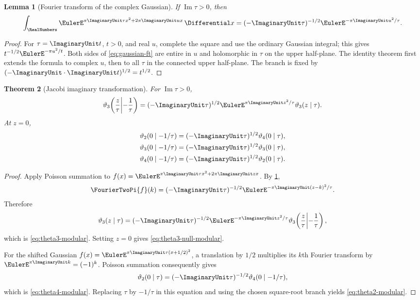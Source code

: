\documentclass[11pt,oneside]{article}
\newtheorem{theorem}{Theorem}[section]
\newtheorem{lemma}[theorem]{Lemma}
\theoremstyle{definition}
\begin{document}
\begin{lemma}[Fourier transform of the complex Gaussian]\label{lem:gaussian-ft}
If $\operatorname{Im}\tau>0$, then
\begin{equation}\label{eq:gaussian-ft}
 \int_\RealNumbers \EulerE^{\pi\ImaginaryUnit\tau x^2+2\pi\ImaginaryUnit ux}\,\Differential x
 =(-\ImaginaryUnit\tau)^{-1/2}\EulerE^{-\pi\ImaginaryUnit u^2/\tau}.
\end{equation}
\end{lemma}

\begin{proof}
For $\tau=\ImaginaryUnit t$, $t>0$, and real $u$, complete the square and use the
ordinary Gaussian integral; this gives
$t^{-1/2}\EulerE^{-\pi u^2/t}$. Both sides of \eqref{eq:gaussian-ft} are
entire in $u$ and holomorphic in $\tau$ on the upper half-plane. The
identity theorem first extends the formula to complex $u$, then to all
$\tau$ in the connected upper half-plane. The branch is fixed by
$(-\ImaginaryUnit\cdot\ImaginaryUnit t)^{1/2}=t^{1/2}$.
\end{proof}

\begin{theorem}[Jacobi imaginary transformation]\label{thm:theta-modular}
For $\operatorname{Im}\tau>0$,
\begin{equation}\label{eq:theta3-modular}
 \vartheta_3\!\left(\frac z\tau\middle|-\frac1\tau\right)
 =(-\ImaginaryUnit\tau)^{1/2}\EulerE^{\pi\ImaginaryUnit z^2/\tau}\vartheta_3(z\mid\tau).
\end{equation}
At $z=0$,
\begin{align}
 \vartheta_2(0\mid-1/\tau)&=(-\ImaginaryUnit\tau)^{1/2}\vartheta_4(0\mid\tau),
 \label{eq:theta2-modular}\\
 \vartheta_3(0\mid-1/\tau)&=(-\ImaginaryUnit\tau)^{1/2}\vartheta_3(0\mid\tau),
 \label{eq:theta3-null-modular}\\
 \vartheta_4(0\mid-1/\tau)&=(-\ImaginaryUnit\tau)^{1/2}\vartheta_2(0\mid\tau).
 \label{eq:theta4-modular}
\end{align}
\end{theorem}

\begin{proof}
Apply Poisson summation to
$f(x)=\EulerE^{\pi\ImaginaryUnit\tau x^2+2\pi\ImaginaryUnit zx}$. By
\cref{lem:gaussian-ft},
\[
\FourierTwoPi{f}(k)=(-\ImaginaryUnit\tau)^{-1/2}
 \EulerE^{-\pi\ImaginaryUnit(z-k)^2/\tau}.
\]
Therefore
\[
 \vartheta_3(z\mid\tau)
 =(-\ImaginaryUnit\tau)^{-1/2}\EulerE^{-\pi\ImaginaryUnit z^2/\tau}
 \vartheta_3\!\left(\frac z\tau\middle|-\frac1\tau\right),
\]
which is \eqref{eq:theta3-modular}. Setting $z=0$ gives
\eqref{eq:theta3-null-modular}.

For the shifted Gaussian $f(x)=\EulerE^{\pi\ImaginaryUnit\tau(x+1/2)^2}$, a translation
by $1/2$ multiplies its $k$th Fourier transform by
$\EulerE^{\pi\ImaginaryUnit k}=(-1)^k$. Poisson summation consequently gives
\[
 \vartheta_2(0\mid\tau)
 =(-\ImaginaryUnit\tau)^{-1/2}\vartheta_4(0\mid-1/\tau),
\]
which is \eqref{eq:theta4-modular}. Replacing $\tau$ by $-1/\tau$ in
this equation and using the chosen square-root branch yields
\eqref{eq:theta2-modular}.
\end{proof}
\end{document}
